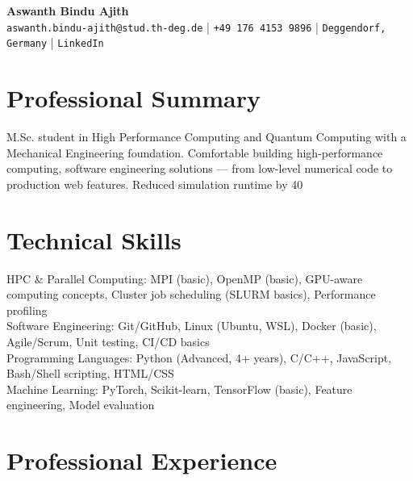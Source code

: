 \documentclass[11pt,a4paper]{article}
\begin{document}
\begin{center}
    {\LARGE\bfseries Aswanth Bindu Ajith}\\[4pt]
    \texttt{aswanth.bindu-ajith@stud.th-deg.de} | \texttt{+49 176 4153 9896} | \texttt{Deggendorf, Germany} | \texttt{LinkedIn}
\end{center}

\section{Professional Summary}
M.Sc. student in High Performance Computing and Quantum Computing with a Mechanical Engineering foundation. Comfortable building high-performance computing, software engineering solutions — from low-level numerical code to production web features. Reduced simulation runtime by 40%

\section{Technical Skills}

HPC & Parallel Computing: MPI (basic), OpenMP (basic), GPU-aware computing concepts, Cluster job scheduling (SLURM basics), Performance profiling\\

Software Engineering: Git/GitHub, Linux (Ubuntu, WSL), Docker (basic), Agile/Scrum, Unit testing, CI/CD basics\\

Programming Languages: Python (Advanced, 4+ years), C/C++, JavaScript, Bash/Shell scripting, HTML/CSS\\

Machine Learning: PyTorch, Scikit-learn, TensorFlow (basic), Feature engineering, Model evaluation


\section{Professional Experience}
\end{document}
